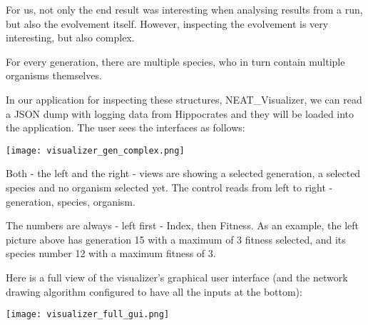 For us, not only the end result was interesting when analysing results from a run, but also the evolvement itself. However, inspecting the evolvement is very interesting, but also complex.

For every generation, there are multiple species, who in turn contain multiple organisms themselves.\cite{Stanley2002}

In our application for inspecting these structures, NEAT\_Visualizer, we can read a JSON dump with logging data from Hippocrates and they will be loaded into the application. The user sees the interfaces as follows:

\texttt{[image: visualizer\_gen\_complex.png]}

Both - the left and the right - views are showing a selected generation, a selected species and no organism selected yet. The control reads from left to right - generation, species, organism.

The numbers are always - left first - Index, then Fitness. As an example, the left picture above has generation 15 with a maximum of 3 fitness selected, and its species number 12 with a maximum fitness of 3.

Here is a full view of the visualizer's graphical user interface (and the network drawing algorithm configured to have all the inputs at the bottom):

\texttt{[image: visualizer\_full\_gui.png]}